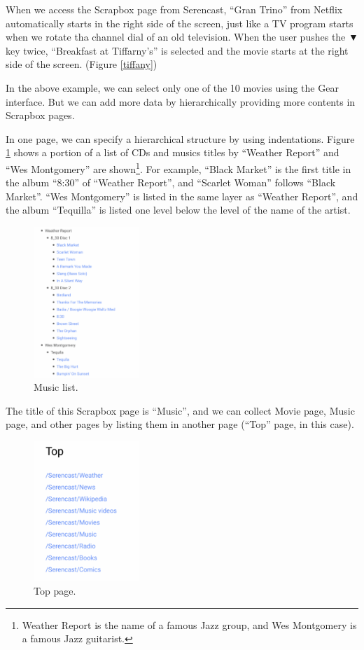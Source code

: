 \documentclass{article}
\def\down{▼}
\def\SC{\textsf{\small Serencast}}
\def\SB{\textsf{\small Scrapbox}}
\begin{document}
When we access the {\SB} page from {\SC},
``Gran Trino'' from Netflix automatically starts in the right side of the screen,
just like a TV program starts when we rotate tha channel dial of an old television.
When the user pushes the {\down} key twice,
``Breakfast at Tiffarny's'' is selected and
the movie starts at the right side of the screen. (Figure \ref{tiffany})

In the above example, we can select only one of the 10 movies using the Gear interface.
But we can add more data by hierarchically providing more contents in {\SB} pages.

In one page, we can specify a hierarchical structure by using indentations.
Figure \ref{musiclist} shows a portion of a list of CDs and
musics titles by ``Weather Report'' and ``Wes Montgomery'' are shown\footnote{
  Weather Report is the name of a famous Jazz group, and Wes Montgomery is a famous Jazz guitarist.
}.
For example, 
``Black Market'' is the first title in the album ``8:30'' of ``Weather Report'', and
``Scarlet Woman'' follows ``Black Market''.
``Wes Montgomery'' is listed in the same layer as ``Weather Report'', and
the album ``Tequilla'' is listed one level below the level of the name of the artist.

\begin{figure}[H]
\centerline{\includegraphics[width=40mm,bb=0 0 652 926]{figures/d8fe8ff8f3e1bbcb34cf51e268592f8c.png}}
\caption{Music list.}
\label{musiclist}
\end{figure}

The title of this {\SB} page is ``Music'', and 
we can collect Movie page, Music page, and other pages by
listing them in another page (``Top'' page, in this case).

\begin{figure}[H]
\centerline{\includegraphics[width=40mm,bb=0 0 396 523]{figures/8a8e4d63b75183f1b4d0ed4db733f500.png}}
\caption{Top page.}
\label{top}
\end{figure}
\end{document}
